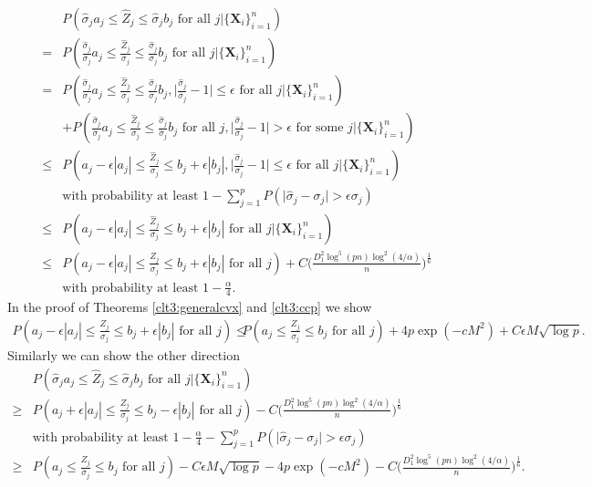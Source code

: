 \documentclass[mnsc,blindrev]{informs4} %
\newcommand{\abs}[1]{\left \vert #1 \right\vert}
\begin{document}
\begin{align*}
&P(\hat\sigma_ja_j\leq \widehat{Z}_j\leq\hat\sigma_j b_j\text{ for all }j\vert \{\mathbf X_i\}_{i=1}^n)\\
=&P(\frac{\hat\sigma_j}{\sigma_j}a_j\leq \frac{\widehat{Z}_j}{\sigma_j}\leq\frac{\hat\sigma_j}{\sigma_j} b_j\text{ for all }j\vert \{\mathbf X_i\}_{i=1}^n)\\
=&P(\frac{\hat\sigma_j}{\sigma_j}a_j\leq \frac{\widehat{Z}_j}{\sigma_j}\leq\frac{\hat\sigma_j}{\sigma_j} b_j,\big\lvert\frac{\hat\sigma_j}{\sigma_j}-1\big\rvert\leq \epsilon\text{ for all }j\vert \{\mathbf X_i\}_{i=1}^n)\\
&+P(\frac{\hat\sigma_j}{\sigma_j}a_j\leq \frac{\widehat{Z}_j}{\sigma_j}\leq\frac{\hat\sigma_j}{\sigma_j} b_j\text{ for all }j,\big\lvert\frac{\hat\sigma_j}{\sigma_j}-1\big\rvert> \epsilon\text{ for some }j\vert \{\mathbf X_i\}_{i=1}^n)\\
\leq &P(a_j-\epsilon \abs{a_j}\leq \frac{\widehat{Z}_j}{\sigma_j}\leq b_j+\epsilon \abs{b_j}, \big\lvert\frac{\hat\sigma_j}{\sigma_j}-1\big\rvert\leq \epsilon\text{ for all }j\vert \{\mathbf X_i\}_{i=1}^n)\\
&\text{with probability at least }1-\sum_{j=1}^pP(\big\lvert\hat\sigma_j-\sigma_j\big\rvert> \epsilon\sigma_j)\\
\leq &P(a_j-\epsilon \abs{a_j}\leq \frac{\widehat{Z}_j}{\sigma_j}\leq b_j+\epsilon \abs{b_j}\text{ for all }j\vert \{\mathbf X_i\}_{i=1}^n)\\
\leq & P(a_j-\epsilon \abs{a_j}\leq \frac{Z_j}{\sigma_j}\leq b_j+\epsilon \abs{b_j}\text{ for all }j)+C\Big(\frac{D_1^2\log^5(pn)\log^2(4/\alpha)}{n}\Big)^{\frac{1}{6}}\\
&\text{with probability at least }1-\frac{\alpha}{4}.
\end{align*}
In the proof of Theorems \ref{clt3:generalcvx} and \ref{clt3:ccp} we show
\begin{align*}
P(a_j-\epsilon \abs{a_j}\leq \frac{Z_j}{\sigma_j}\leq b_j+\epsilon \abs{b_j}\text{ for all }j)
\leq &P(a_j\leq \frac{Z_j}{\sigma_j}\leq b_j\text{ for all }j)+4p\exp(-cM^2)+C\epsilon M\sqrt{\log p}.
\end{align*}
Similarly we can show the other direction
\begin{align*}
&P(\hat\sigma_ja_j\leq \widehat{Z}_j\leq\hat\sigma_j b_j\text{ for all }j\vert \{\mathbf X_i\}_{i=1}^n)\\
\geq& P(a_j+\epsilon \abs{a_j}\leq \frac{Z_j}{\sigma_j}\leq b_j-\epsilon \abs{b_j}\text{ for all }j)-C\Big(\frac{D_1^2\log^5(pn)\log^2(4/\alpha)}{n}\Big)^{\frac{1}{6}}\\
&\text{with probability at least }1-\frac{\alpha}{4}-\sum_{j=1}^pP(\big\lvert\hat\sigma_j-\sigma_j\big\rvert> \epsilon\sigma_j)\\
\geq &P(a_j\leq \frac{Z_j}{\sigma_j}\leq b_j\text{ for all }j)-C\epsilon M\sqrt{\log p}-4p\exp(-cM^2)-C\Big(\frac{D_1^2\log^5(pn)\log^2(4/\alpha)}{n}\Big)^{\frac{1}{6}}.
\end{align*}
\end{document}

